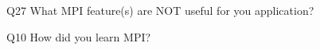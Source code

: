 \begin{description}%
\item{Q27} What MPI feature(s) are NOT useful for you application?%
\item{Q10} How did you learn MPI?%
\end{description}%
